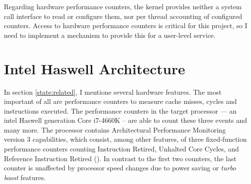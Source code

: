 Regarding hardware performance counters, the kernel provides neither a system
call interface to read or configure them, nor per thread accounting of
configured counters.
Access to hardware performance counters is critical for this project, so I need
to implement a mechanism to provide this for a user-level service.



\begin{comment}
\textbf{Fiasco.OC}
\begin{itemize}
  \item Kernel scheduler does no balancing, assigns thread to the first
    core specified in the affinity descriptor
  \item affinity descriptor: core(s) a thread should run on
  \item Syscall via run\_thread() to pass affinity descr to kernel scheduler
  \item interface to query execution time for each thread
  \item capability system -- to derive communication relationships from
  \item	Kernel feature wishes derived from related work: Performance counters
    and per thread accounting
\end{itemize}

\textbf{L4Re}
\begin{itemize}
  \item provides scheduler proxy interface, including affinity descriptor,
    scheduling parameters
  \item syscall interface
\end{itemize}
\end{comment}



\section{Intel Haswell Architecture}
\label{state:haswell}

In section \ref{state:related}, I mentione several hardware features.
The most important of all are performance counters to measure cache misses,
cycles and instructions executed.
The performance counters in the target processor --- an \gls{intel} Haswell
generation Core i7-4660K -- are able to count these three events and many more.
The processor contains Architectural Performance Monitoring version 3
capabilities, which consist, among other features, of three fixed-function
performance counters counting Instruction Retired, Unhalted Core Cycles, and
Reference Instruction Retired (\cite{intel_arch_ref_manual_2015}).
In contrast to the first two counters, the last counter is unaffected by
processor speed changes due to power saving or \textit{turbo boost} features.

